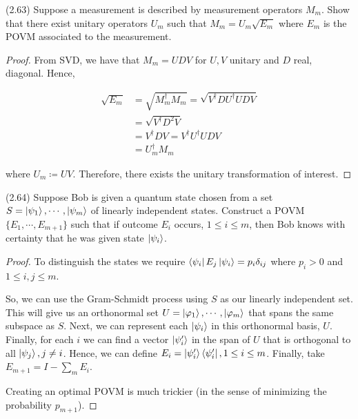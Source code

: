 \documentclass[main.tex]{subfiles}
\begin{document}
\begin{subappendices}
\begin{exercise} (2.63) Suppose a measurement is described by measurement operators $M_m$. Show that there exist unitary operators $U_m$ such that $M_m  = U_m\sqrt{E_m}$ where $E_m$ is the POVM associated to the measurement. 

\begin{proof}
From SVD, we have that $M_m = UDV$ for $U,V$ unitary and $D$ real, diagonal. Hence,

\begin{align*}
\sqrt{E_m} &= \sqrt{M_m^\dag M_m} = \sqrt{V^\dag DU^\dag UDV} \\ 	
&= \sqrt{V^\dag D^2V} \\
&= V^\dag DV = V^\dag U^\dag UDV \\
&= U_m^\dag M_m
\end{align*}
 
where $U_m \coloneqq UV$. Therefore, there exists the unitary transformation of interest.

\end{proof}
\end{exercise}

\begin{exercise} (2.64) Suppose Bob is given a quantum state chosen from a set $S = \ket{\psi_1} , \cdots , \ket{\psi_m}$ of linearly independent states. Construct a POVM $\{ E_1 , \cdots , E_{m+1} \}$ such that if outcome $E_i$ occurs, $1 \leq i \leq m$, then Bob knows with certainty that he was given state $\ket{\psi_i}$.

\begin{proof}
	To distinguish the states we require $\bra{\psi_i} E_j \ket{\psi_i} = p_i \delta_{ij}$ where $p_i > 0$ and $1 \leq i,j \leq m$. 

So, we can use the Gram-Schmidt process using $S$ as our linearly independent set. This will give us an orthonormal set $U = \ket{\varphi_1} , \cdots , \ket{\varphi_m}$ that spans the same subspace as $S$. Next, we can represent each $\ket{\psi_i}$ in this orthonormal basis, $U$. Finally, for each $i$ we can find a vector $\ket{\psi'_i}$ in the span of $U$ that is orthogonal to all $\ket{\psi_j}, j \neq i$. Hence, we can define $E_i = \ket{\psi_i'} \bra{\psi_i'}, 1 \leq i \leq m$. Finally, take $E_{m+1} = I - \sum_m E_i$. 

Creating an optimal POVM is much trickier (in the sense of minimizing the probability $p_{m+1}$).
\end{proof}
\end{exercise}


\end{subappendices}
\end{document}

